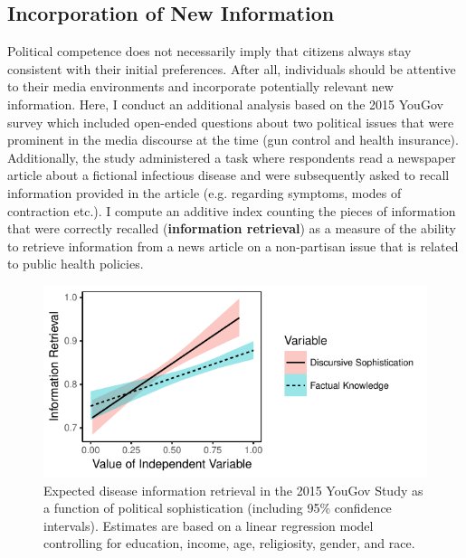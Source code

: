 \documentclass[12pt]{article}
\begin{document}
\subsection*{Incorporation of New Information}

Political competence does not necessarily imply that citizens always stay consistent with their initial preferences. After all, individuals should be attentive to their media environments and incorporate potentially relevant new information. Here, I conduct an additional analysis based on the 2015 YouGov survey which included open-ended questions about two political issues that were prominent in the media discourse at the time (gun control and health insurance). Additionally, the study administered a task where respondents read a newspaper article about a fictional infectious disease and were subsequently asked to recall information provided in the article (e.g. regarding symptoms, modes of contraction etc.). I compute an additive index counting the pieces of information that were correctly recalled (\textbf{information retrieval}) as a measure of the ability to retrieve information from a news article on a non-partisan issue that is related to public health policies. 

\begin{figure}[h]\centering
\includegraphics{../fig/yg_disease.pdf}
\caption{Expected disease information retrieval in the 2015 YouGov Study as a function of political sophistication (including 95\% confidence intervals). Estimates are based on a linear regression model controlling for education, income, age, religiosity, gender, and race.}\label{fig:yg_disease}
\end{figure}
\end{document}
